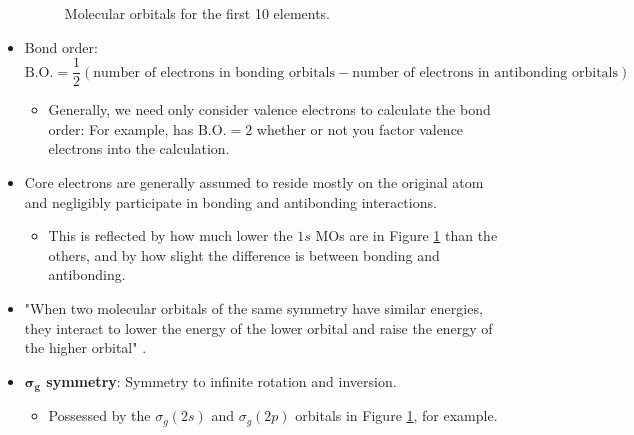 \documentclass[../notes.tex]{subfiles}
\begin{document}
\begin{itemize}
\begin{figure}[h!]
        \caption{Molecular orbitals for the first 10 elements.}
        \label{fig:molecularOrbitals-first10}
    \end{figure}
    \item Bond order:
    \begin{equation*}
        \text{B.O.} = \frac{1}{2}(\text{number of electrons in bonding orbitals}-\text{number of electrons in antibonding orbitals})
    \end{equation*}
    \begin{itemize}
        \item Generally, we need only consider valence electrons to calculate the bond order: For example,  has $\text{B.O.}=2$ whether or not you factor valence electrons into the calculation.
    \end{itemize}
    \item Core electrons are generally assumed to reside mostly on the original atom and negligibly participate in bonding and antibonding interactions.
    \begin{itemize}
        \item This is reflected by how much lower the $1s$ MOs are in Figure \ref{fig:molecularOrbitals-first10} than the others, and by how slight the difference is between bonding and antibonding.
    \end{itemize}
    \item "When two molecular orbitals of the same symmetry have similar energies, they interact to lower the energy of the lower orbital and raise the energy of the higher orbital" \parencite[124]{bib:MiesslerFischerTarr}.
    \item \textbf{$\bm{\sigma_g}$ symmetry}: Symmetry to infinite rotation and inversion.
    \begin{itemize}
        \item Possessed by the $\sigma_g(2s)$ and $\sigma_g(2p)$ orbitals in Figure \ref{fig:molecularOrbitals-first10}, for example.

\end{itemize}
\end{itemize}
\end{document}
